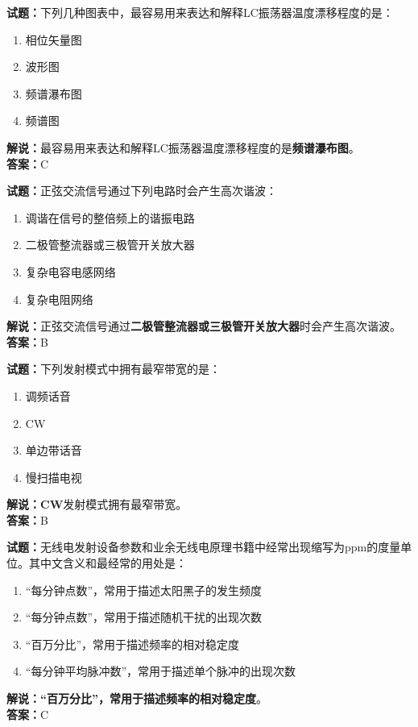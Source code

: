 \documentclass{ctexbook}
\begin{document}
\bigskip


\noindent\textbf{试题：}下列几种图表中，最容易用来表达和解释LC振荡器温度漂移程度的是：
\begin{enumerate}[leftmargin=3em]
\item 相位矢量图
\item 波形图
\item 频谱瀑布图
\item 频谱图
\end{enumerate}
\noindent\textbf{解说：}最容易用来表达和解释LC振荡器温度漂移程度的是\textbf{频谱瀑布图}。\\\noindent\textbf{答案：}C



\bigskip


\noindent\textbf{试题：}正弦交流信号通过下列电路时会产生高次谐波：
\begin{enumerate}[leftmargin=3em]
\item 调谐在信号的整倍频上的谐振电路
\item 二极管整流器或三极管开关放大器
\item 复杂电容电感网络
\item 复杂电阻网络
\end{enumerate}
\noindent\textbf{解说：}正弦交流信号通过\textbf{二极管整流器或三极管开关放大器}时会产生高次谐波。\\\noindent\textbf{答案：}B



\bigskip


\noindent\textbf{试题：}下列发射模式中拥有最窄带宽的是：
\begin{enumerate}[leftmargin=3em]
\item 调频话音
\item CW
\item 单边带话音
\item 慢扫描电视
\end{enumerate}
\noindent\textbf{解说：}\textbf{CW}发射模式拥有最窄带宽。\\\noindent\textbf{答案：}B



\bigskip


\noindent\textbf{试题：}无线电发射设备参数和业余无线电原理书籍中经常出现缩写为ppm的度量单位。其中文含义和最经常的用处是：
\begin{enumerate}[leftmargin=3em]
\item “每分钟点数”，常用于描述太阳黑子的发生频度
\item “每分钟点数”，常用于描述随机干扰的出现次数
\item “百万分比”，常用于描述频率的相对稳定度
\item “每分钟平均脉冲数”，常用于描述单个脉冲的出现次数
\end{enumerate}
\noindent\textbf{解说：}\textbf{“百万分比”，常用于描述频率的相对稳定度}。\\\noindent\textbf{答案：}C
\end{document}
